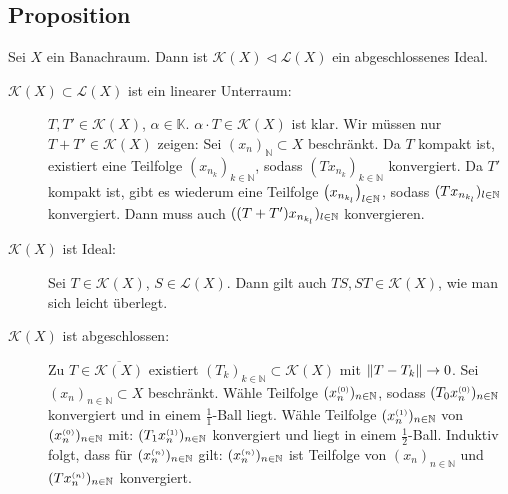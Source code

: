 \subsection[Proposition: Die Menge der kompakten Operatoren ist ein abgeschlossenes Ideal in $\mathcal{L}(X)$]{Proposition} %
\label{sub:89}
Sei $X$ ein Banachraum. Dann ist $\mathcal{K}(X) \lhd \mathcal{L}(X)$ ein abgeschlossenes Ideal.
\begin{description}
	\item[$\mathcal{K}(X) \subset \mathcal{L}(X)$ ist ein linearer Unterraum:] $T,T' \in \mathcal{K}(X)$, $\alpha \in \mathds{K}$. $\alpha \cdot T \in \mathcal{K}(X)$ ist 
	klar. Wir müssen nur $T+T' \in \mathcal{K}(X)$ zeigen: Sei $(x_n)_\mathds{N} \subset X$ beschränkt. Da $T$ kompakt ist, existiert eine Teilfolge 
	$(x_{n_k})_{k \in \mathds{N}}$, sodass $(T x_{n_k})_{k \in \mathds{N}}$ konvergiert. Da $T'$ kompakt ist, gibt es wiederum eine Teilfolge 
	$\enbrace[\big]{\cramped{x_{n_{k_l}}}}_{l \in \mathds{N}}$, sodass $(T x_{n_{k_l}})_{l \in \mathbb{N}}$ konvergiert. Dann muss auch 
	$((T+T')x_{n_{k_l}})_{l \in \mathbb{N}}$ konvergieren.
	\item[$\mathcal{K}(X)$ ist Ideal:] Sei $T \in \mathcal{K}(X)$, $S \in \mathcal{L}(X)$. Dann gilt auch $TS, ST \in \mathcal{K}(X)$, wie man sich leicht überlegt.
	\item[$\mathcal{K}(X)$ ist abgeschlossen:] Zu $T \in \overline{\mathcal{K}(X)}$ existiert $(T_k)_{k \in \mathds{N}} \subset \mathcal{K}(X)$ mit
	$\norm{T-T_k} \to 0$. Sei $(x_n)_{n \in \mathds{N}} \subset X$ beschränkt. Wähle Teilfolge $(x_n^{\scriptscriptstyle(0)})_{n \in \mathbb{N}}$, sodass 
	$(T_0 x_n^{\scriptscriptstyle(0)})_{n \in \mathbb{N}}$ konvergiert und in einem $\frac{1}{1}$-Ball liegt. Wähle Teilfolge $(x_n^{\scriptscriptstyle(1)})_{n \in \mathbb{N}}$ von
	$(x_n^{\scriptscriptstyle(0)})_{n \in \mathbb{N}}$ mit: $(T_1 x_n^{\scriptscriptstyle(1)})_{n \in \mathbb{N}}$ konvergiert und liegt in einem $\frac{1}{2}$-Ball. Induktiv folgt, dass
	für $(x_n^{\scriptscriptstyle(n)})_{n \in \mathbb{N}}$ gilt: $(x_n^{\scriptscriptstyle(n)})_{n \in \mathbb{N}}$ ist Teilfolge von $(x_n)_{n \in \mathds{N}}$ und 
	$(Tx_n^{\scriptscriptstyle(n)})_{n \in \mathbb{N}}$ konvergiert. \bewende
\end{description}

